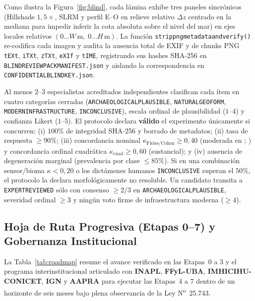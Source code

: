 \documentclass[11pt,a4paper]{article}
\DeclareRobustCommand{\_}{\ifmmode\mbox{\textunderscore}\else\textunderscore\allowbreak\fi}
\begin{document}
Como ilustra la Figura~\ref{fig:blind}, cada l\'amina exhibe tres paneles sincr\'onicos (Hillshade $1{,}5\times$, SLRM y perfil E--O en relieve relativo $\Delta z$ centrado en la mediana para impedir inferir la cota absoluta sobre el nivel del mar) en ejes locales relativos $(0\ldots W\,\mathrm{m},\; 0\ldots H\,\mathrm{m})$. La funci\'on \texttt{strip\_png\_metadata\_and\_verify()} re-codifica cada imagen y audita la ausencia total de EXIF y de chunks PNG \texttt{tEXt}, \texttt{iTXt}, \texttt{zTXt}, \texttt{eXIf} y \texttt{tIME}, registrando sus hashes SHA-256 en \texttt{BLIND\_REVIEW\_PACK\_MANIFEST.json} y aislando la correspondencia en \texttt{CONFIDENTIAL\_BLIND\_KEY.json}.

Al menos $2$--$3$ especialistas acreditados independientes clasifican cada \'item en cuatro categor\'ias cerradas (\texttt{ARCHAEOLOGICAL\_PLAUSIBLE}, \texttt{NATURAL\_GEOFORM}, \texttt{MODERN\_INFRASTRUCTURE}, \texttt{INCONCLUSIVE}), escala ordinal de plausibilidad ($1$--$4$) y confianza Likert ($1$--$5$). El protocolo declara \textbf{v\'alido} el experimento \'unicamente si concurren: (i) $100\%$ de integridad SHA-256 y borrado de metadatos; (ii) tasa de respuesta $\ge 90\%$; (iii) concordancia nominal $\kappa_{\mathrm{Fleiss/Cohen}} \ge 0{,}40$ (moderada en \citealp{LandisKoch1977}; \citealp{Cohen1960,Fleiss1971}) y concordancia ordinal cuadr\'atica $\kappa_{\mathrm{cuad}} \ge 0{,}60$ (sustancial); y (iv) ausencia de degeneraci\'on marginal (prevalencia por clase $\le 85\%$). Si en una combinaci\'on sensor/bioma $\kappa < 0{,}20$ o los dict\'amenes humanos \texttt{INCONCLUSIVE} superan el $50\%$, el protocolo la declara morfol\'ogicamente no resoluble. Un candidato transita a \texttt{EXPERT\_REVIEWED} s\'olo con consenso $\ge 2/3$ en \texttt{ARCHAEOLOGICAL\_PLAUSIBLE}, severidad ordinal $\ge 3$ y ning\'un voto firme de infraestructura moderna ($\ge 4$).

\subsection{Hoja de Ruta Progresiva (Etapas 0--7) y Gobernanza Institucional}

La Tabla~\ref{tab:roadmap} resume el avance verificado en las Etapas~0 a 3 y el programa interinstitucional articulado con \textbf{INAPL}, \textbf{FFyL-UBA}, \textbf{IMHICIHU-CONICET}, \textbf{IGN} y \textbf{AAPRA} para ejecutar las Etapas~4 a 7 dentro de un horizonte de seis meses bajo plena observancia de la Ley N\textsuperscript{o}~25.743.
\end{document}
